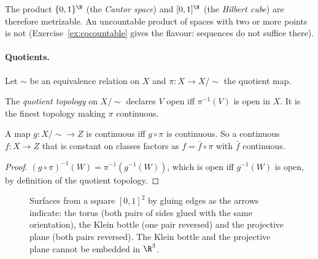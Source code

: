 The product $\{0,1\}^\N$ (the \emph{Cantor space}) and $[0,1]^\N$ (the \emph{Hilbert cube}) are therefore metrizable. An uncountable product of
spaces with two or more points is not (Exercise~\ref{ex:cocountable} gives the flavour: sequences do not suffice there).

\paragraph{Quotients.} Let $\sim$ be an equivalence relation on $X$ and $\pi:X\to X/{\sim}$ the quotient map.

\begin{definition}
The \emph{quotient topology} on $X/{\sim}$ declares $V$ open iff $\pi^{-1}(V)$ is open in $X$. It is the finest topology making $\pi$ continuous.
\end{definition}

\begin{proposition}\label{prop:quotient}
A map $g:X/{\sim}\to Z$ is continuous iff $g\circ\pi$ is continuous. So a continuous $f:X\to Z$ that is constant on classes factors as $f=\bar f\circ\pi$
with $\bar f$ continuous.
\end{proposition}
\begin{proof}
$(g\circ\pi)^{-1}(W)=\pi^{-1}(g^{-1}(W))$, which is open iff $g^{-1}(W)$ is open, by definition of the quotient topology.
\end{proof}

\begin{figure}[ht]
\centering
{}
\caption{Surfaces from a square $[0,1]^2$ by gluing edges as the arrows indicate: the torus (both pairs of sides glued with the same
orientation), the Klein bottle (one pair reversed) and the projective plane (both pairs reversed). The Klein bottle and the projective plane
cannot be embedded in $\R^3$.}
\label{fig:gluing}
\end{figure}

